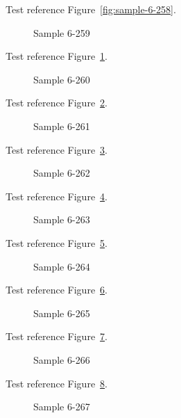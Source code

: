 Test reference Figure~\ref{fig:sample-6-258}.

\begin{figure}[tbhp]
\caption{Sample 6-259}
\label{fig:sample-6-259}
\end{figure}

Test reference Figure~\ref{fig:sample-6-259}.

\begin{figure}[tbhp]
\caption{Sample 6-260}
\label{fig:sample-6-260}
\end{figure}

Test reference Figure~\ref{fig:sample-6-260}.

\begin{figure}[tbhp]
\caption{Sample 6-261}
\label{fig:sample-6-261}
\end{figure}

Test reference Figure~\ref{fig:sample-6-261}.

\begin{figure}[tbhp]
\caption{Sample 6-262}
\label{fig:sample-6-262}
\end{figure}

Test reference Figure~\ref{fig:sample-6-262}.

\begin{figure}[tbhp]
\caption{Sample 6-263}
\label{fig:sample-6-263}
\end{figure}

Test reference Figure~\ref{fig:sample-6-263}.

\begin{figure}[tbhp]
\caption{Sample 6-264}
\label{fig:sample-6-264}
\end{figure}

Test reference Figure~\ref{fig:sample-6-264}.

\begin{figure}[tbhp]
\caption{Sample 6-265}
\label{fig:sample-6-265}
\end{figure}

Test reference Figure~\ref{fig:sample-6-265}.

\begin{figure}[tbhp]
\caption{Sample 6-266}
\label{fig:sample-6-266}
\end{figure}

Test reference Figure~\ref{fig:sample-6-266}.

\begin{figure}[tbhp]
\caption{Sample 6-267}
\label{fig:sample-6-267}
\end{figure}

